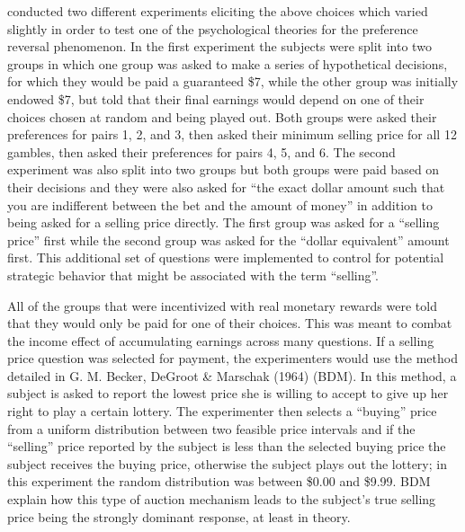 \textcite{Grether1979} conducted two different experiments eliciting the above choices which  varied slightly in order to test one of the psychological theories for the preference reversal phenomenon.
In the first experiment the subjects were split into two groups in which one group was asked to make a series of hypothetical decisions, for which they would be paid a guaranteed \$7, while the other group was initially endowed \$7, but told that their final earnings would depend on one of their choices chosen at random and being played out.
Both groups were asked their preferences for pairs 1, 2, and 3, then asked their minimum selling price for all 12 gambles, then asked their preferences for pairs 4, 5, and 6.
The second experiment was also split into two groups but both groups were paid based on their decisions and they were also asked for \enquote{the exact dollar amount such that you are indifferent between the bet and the amount of money} in addition to being asked for a selling price directly.
The first group was asked for a \enquote{selling price} first while the second group was asked for the \enquote{dollar equivalent} amount first.
This additional set of questions were implemented to control for potential strategic behavior that might be associated with the term \enquote{selling}.

All of the groups that were incentivized with real monetary rewards were told that they would only be paid for one of their choices.
This was meant to combat the income effect of accumulating earnings across many questions.
If a selling price question was selected for payment, the experimenters would use the method detailed in G. M. Becker, DeGroot \& Marschak (1964) (BDM).
In this method, a subject is asked to report the lowest price she is willing to accept to give up her right to play a certain lottery.
The experimenter then selects a \enquote{buying} price from a uniform distribution between two feasible price intervals and if the \enquote{selling} price reported by the subject is less than the selected buying price the subject receives the buying price, otherwise the subject plays out the lottery; in this experiment the random distribution was between \$0.00 and \$9.99.
BDM explain how this type of auction mechanism leads to the subject's true selling price being the strongly dominant response, at least in theory.

